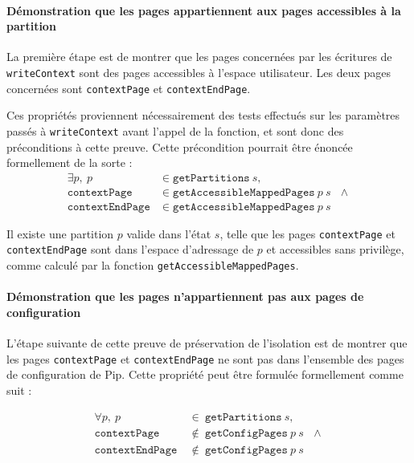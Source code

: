 			\paragraph{Démonstration que les pages appartiennent aux pages accessibles à la partition}

			La première étape est de montrer que les pages concernées par les écritures de \texttt{writeContext} sont des pages accessibles à l'espace utilisateur. Les deux pages concernées sont \texttt{contextPage} et \texttt{contextEndPage}. 

			Ces propriétés proviennent nécessairement des tests effectués sur les paramètres passés à \texttt{writeContext} avant l'appel de la fonction, et sont donc des préconditions à cette preuve. Cette précondition pourrait être énoncée formellement de la sorte :\\
			\begin{align*}
				\exists p,~p &\in \mathtt{getPartitions}~s,\\
				\mathtt{contextPage} &\in \mathtt{getAccessibleMappedPages}~p~s~~~\wedge\\
				\mathtt{contextEndPage} &\in \mathtt{getAccessibleMappedPages}~p~s
			\end{align*}

			\begin{theorem}
				Il existe une partition $p$ valide dans l'état $s$, telle que les pages \texttt{contextPage} et \texttt{contextEndPage} sont dans l'espace d'adressage de $p$ et accessibles sans privilège, comme calculé par la fonction \texttt{getAccessibleMappedPages}.
			\end{theorem}

			\paragraph{Démonstration que les pages n'appartiennent pas aux pages de configuration}

			L'étape suivante de cette preuve de préservation de l'isolation est de montrer que les pages \texttt{contextPage} et \texttt{contextEndPage} ne sont pas dans l'ensemble des pages de configuration de Pip. Cette propriété peut être formulée formellement comme suit :

			\begin{align*}
				\forall p,~p~&\in~\mathtt{getPartitions}~s,\\
				\mathtt{contextPage}~&\notin~\mathtt{getConfigPages}~p~s~~~\wedge\\
				\mathtt{contextEndPage}~&\notin~\mathtt{getConfigPages}~p~s
			\end{align*}

